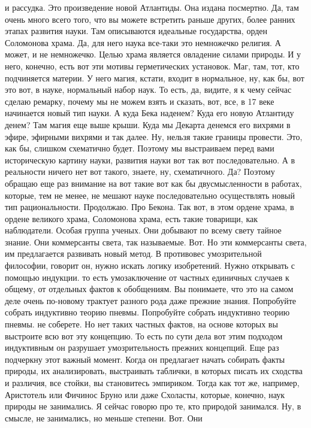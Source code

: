 и рассудка. Это произведение новой Атлантиды. Она издана посмертно. Да, там
очень много всего того, что вы можете встретить раньше других, более ранних
этапах развития науки. Там описываются идеальные государства, орден Соломонова
храма. Да, для него наука все-таки это немножечко религия. А может, и не
немножечко. Целью храма является овладение силами природы. И у него, конечно,
есть вот эти мотивы герметических установок. Маг, там, тот, кто подчиняется
материи. У него магия, кстати, входит в нормальное, ну, как бы, вот это вот, в
науке, нормальный набор наук. То есть, да, видите, я к чему сейчас сделаю
ремарку, почему мы не можем взять и сказать, вот, все, в 17 веке начинается
новый тип науки. А куда Бека наденем? Куда его новую Атлантиду денем? Там магия
еще выше крыши. Куда мы Декарта денемся его вихрями в эфире, эфирными вихрями и
так далее. Ну, нельзя такие границы провести. Это, как бы, слишком схематично
будет. Поэтому мы выстраиваем перед вами историческую картину науки, развития
науки вот так вот последовательно. А в реальности ничего нет вот такого, знаете,
ну, схематичного. Да? Поэтому обращаю еще раз внимание на вот такие вот как бы
двусмысленности в работах, которые, тем не менее, не мешают науке
последовательно осуществлять новый тип рациональности. Продолжаю. Про Бекона.
Так вот, в этом ордене храма, в ордене великого храма, Соломонова храма, есть
такие товарищи, как наблюдатели. Особая группа ученых. Они добывают по всему
свету тайное знание. Они коммерсанты света, так называемые. Вот. Но эти
коммерсанты света, им предлагается развивать новый метод. В противовес
умозрительной философии, говорит он, нужно искать логику изобретений. Нужно
открывать с помощью индукции. то есть умозаключение от частных единичных случаев
к общему, от отдельных фактов к обобщениям. Вы понимаете, что это на самом деле
очень по-новому трактует разного рода даже прежние знания. Попробуйте собрать
индуктивно теорию пневмы. Попробуйте собрать индуктивно теорию пневмы. не
соберете. Но нет таких частных фактов, на основе которых вы выстроите всю вот
эту концепцию. То есть по сути дела вот этим подходом индуктивным он разрушает
умозрительность прежних концепций. Еще раз подчеркну этот важный момент. Когда
он предлагает начать собирать факты природы, их анализировать, выстраивать
таблички, в которых писать их сходства и различия, все стойки, вы становитесь
эмпириком. Тогда как тот же, например, Аристотель или Фичинос Бруно или даже
Схоласты, которые, конечно, наук природы не занимались. Я сейчас говорю про те,
кто природой занимался. Ну, в смысле, не занимались, но меньше степени. Вот. Они
